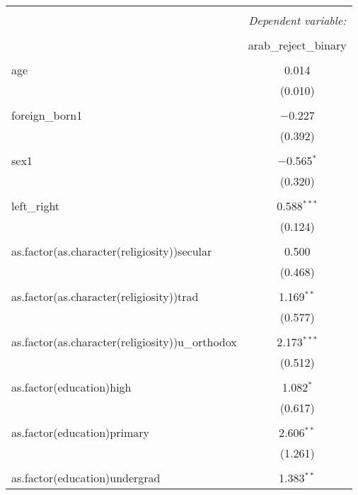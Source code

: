 \documentclass[12pt,letterpaper]{article}
\begin{document}
\begin{table}[!htbp] \centering 
	\caption{} 
	\label{} 
	\scriptsize
	\begin{adjustbox}{max width=\textwidth}
	
	\begin{tabular}{@{\extracolsep{2pt}}lc} 
		\\[-1.8ex]\hline 
		\hline \\[-1.8ex] 
		& \multicolumn{1}{c}{\textit{Dependent variable:}} \\ 
		\cline{2-2} 
		\\[-1.8ex] & arab\_reject\_binary \\ 
		\hline \\[-1.8ex] 
		age & 0.014 \\ 
		& (0.010) \\ 
		& \\ 
		foreign\_born1 & $-$0.227 \\ 
		& (0.392) \\ 
		& \\ 
		sex1 & $-$0.565$^{*}$ \\ 
		& (0.320) \\ 
		& \\ 
		left\_right & 0.588$^{***}$ \\ 
		& (0.124) \\ 
		& \\ 
		as.factor(as.character(religiosity))secular & 0.500 \\ 
		& (0.468) \\ 
		& \\ 
		as.factor(as.character(religiosity))trad & 1.169$^{**}$ \\ 
		& (0.577) \\ 
		& \\ 
		as.factor(as.character(religiosity))u\_orthodox & 2.173$^{***}$ \\ 
		& (0.512) \\ 
		& \\ 
		as.factor(education)high & 1.082$^{*}$ \\ 
		& (0.617) \\ 
		& \\ 
		as.factor(education)primary & 2.606$^{**}$ \\ 
		& (1.261) \\ 
		& \\ 
		as.factor(education)undergrad & 1.383$^{**}$ \\ 

\end{tabular}
\end{adjustbox}
\end{table}
\end{document}
